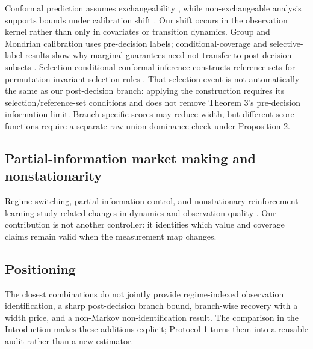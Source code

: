 Conformal prediction assumes exchangeability \cite{vovk2005,lei2018}, while non-exchangeable analysis supports bounds under calibration shift \cite{barber2023,tibshirani2019,ai2024,xu2025,correia2025,aolaritei2025,pournaderi2026,choi2026,wang2026,gibbs2021,principato2025,lade2026,bates2021}. Our shift occurs in the observation kernel rather than only in covariates or transition dynamics. Group and Mondrian calibration uses pre-decision labels; conditional-coverage and selective-label results show why marginal guarantees need not transfer to post-decision subsets \cite{barber2021,lakkaraju2017,kleinberg2018}. Selection-conditional conformal inference constructs reference sets for permutation-invariant selection rules \cite{jin2024jomi}. That selection event is not automatically the same as our post-decision branch: applying the construction requires its selection/reference-set conditions and does not remove Theorem 3's pre-decision information limit. Branch-specific scores may reduce width, but different score functions require a separate raw-union dominance check under Proposition 2.

\subsection{Partial-information market making and nonstationarity}

Regime switching, partial-information control, and nonstationary reinforcement learning study related changes in dynamics and observation quality \cite{cartea2024,bergault2025,chionas2026,chevalier2024,chevalier2025,barucci2025,akgul2025}. Our contribution is not another controller: it identifies which value and coverage claims remain valid when the measurement map changes.

\subsection{Positioning}

The closest combinations do not jointly provide regime-indexed observation identification, a sharp post-decision branch bound, branch-wise recovery with a width price, and a non-Markov non-identification result. The comparison in the Introduction makes these additions explicit; Protocol 1 turns them into a reusable audit rather than a new estimator.


